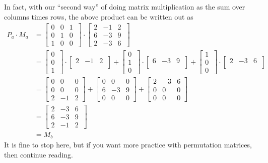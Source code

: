  In fact, with our ``second way'' of doing matrix multiplication as the sum over columns times rows, the above product can be written out as 
 \begin{align*}
 P_a \cdot M_a &= \left[ \begin{array}{rrr} 0 & 0 & 1\\
 0 & 1& 0 \\ 1 & 0 & 0 \end{array}\ \right] \cdot\left[ \begin{array}{rrr} 2 & -1 & 2\\
 6 & -3& 9 \\ 2 & -3 & 6  \end{array}\ \right] \\
 &=  \left[ \begin{array}{r} 0 \\ 0  \\ 1\end{array}\ \right] \cdot
 \left[ \begin{array}{rrr} 2 & -1 & 2\\  \end{array}\ \right] 
 +  \left[ \begin{array}{r} 0 \\ 1  \\ 0\end{array}\ \right] \cdot
 \left[ \begin{array}{rrr} 6 & -3& 9 \\  \end{array}\ \right] +
  \left[ \begin{array}{r} 1 \\ 0  \\ 0\end{array}\ \right] \cdot
 \left[ \begin{array}{rrr} 2 & -3 & 6  \\  \end{array}\ \right] \\
 &= \left[ \begin{array}{rrr} 0 & 0 & 0\\  0 & 0 & 0 \\2 & -1 & 2 \end{array} \right] + \left[ \begin{array}{rrr} 0 & 0 & 0\\ 6 & -3& 9  \\0 & 0 & 0 \end{array} \right]
 +  \left[ \begin{array}{rrr} 2 & -3 & 6\\ 0 & 0 & 0  \\0 & 0 & 0 \end{array} \right] \\ 
 &=  \left[ \begin{array}{rrr} 2 & -3 & 6\\
 6 & -3& 9 \\  2 & -1 & 2 \end{array}\ \right] \\
 &= M_b
 \end{align*} 
  It is fine to stop here, but if you want more practice with permutation matrices, then continue reading.\\
 
